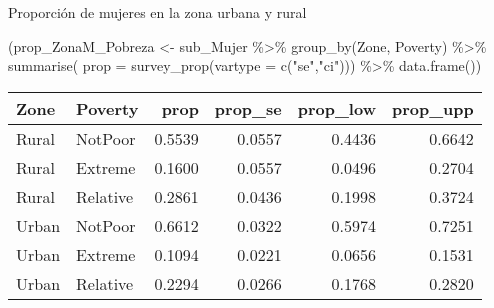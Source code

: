 \documentclass[
  ignorenonframetext,
]{beamer}
\newenvironment{Shaded}{\begin{snugshade}}{\end{snugshade}}
\newcommand{\AttributeTok}[1]{\textcolor[rgb]{0.77,0.63,0.00}{#1}}
\newcommand{\FunctionTok}[1]{\textcolor[rgb]{0.00,0.00,0.00}{#1}}
\newcommand{\NormalTok}[1]{#1}
\newcommand{\OtherTok}[1]{\textcolor[rgb]{0.56,0.35,0.01}{#1}}
\newcommand{\SpecialCharTok}[1]{\textcolor[rgb]{0.00,0.00,0.00}{#1}}
\newcommand{\StringTok}[1]{\textcolor[rgb]{0.31,0.60,0.02}{#1}}
\begin{document}
\begin{frame}[fragile]{Proporción de mujeres en la zona urbana y rural}
\protect\hypertarget{proporciuxf3n-de-mujeres-en-la-zona-urbana-y-rural-1}{}
\begin{Shaded}
\begin{Highlighting}[]
\NormalTok{(prop\_ZonaM\_Pobreza }\OtherTok{\textless{}{-}}\NormalTok{ sub\_Mujer }\SpecialCharTok{\%\textgreater{}\%} 
   \FunctionTok{group\_by}\NormalTok{(Zone, Poverty) }\SpecialCharTok{\%\textgreater{}\%} 
   \FunctionTok{summarise}\NormalTok{(}
     \AttributeTok{prop =} \FunctionTok{survey\_prop}\NormalTok{(}\AttributeTok{vartype =} \FunctionTok{c}\NormalTok{(}\StringTok{"se"}\NormalTok{,}\StringTok{"ci"}\NormalTok{))) }\SpecialCharTok{\%\textgreater{}\%}
   \FunctionTok{data.frame}\NormalTok{())}
\end{Highlighting}
\end{Shaded}

\begin{longtable}[]{@{}llrrrr@{}}
\toprule
Zone & Poverty & prop & prop\_se & prop\_low & prop\_upp \\
\midrule
\endhead
Rural & NotPoor & 0.5539 & 0.0557 & 0.4436 & 0.6642 \\
Rural & Extreme & 0.1600 & 0.0557 & 0.0496 & 0.2704 \\
Rural & Relative & 0.2861 & 0.0436 & 0.1998 & 0.3724 \\
Urban & NotPoor & 0.6612 & 0.0322 & 0.5974 & 0.7251 \\
Urban & Extreme & 0.1094 & 0.0221 & 0.0656 & 0.1531 \\
Urban & Relative & 0.2294 & 0.0266 & 0.1768 & 0.2820 \\
\bottomrule
\end{longtable}
\end{frame}
\end{document}
